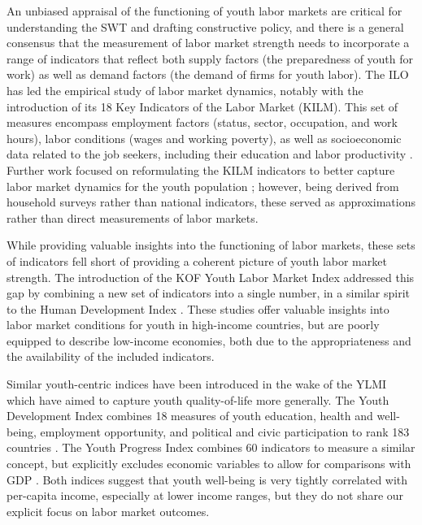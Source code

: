 \documentclass[
  a4paper, twoside, 12pt]{book}
\begin{document}
An unbiased appraisal of the functioning of youth labor markets are critical for understanding the SWT and drafting constructive policy, and there is a general consensus that the measurement of labor market strength needs to incorporate a range of indicators that reflect both supply factors (the preparedness of youth for work) as well as demand factors (the demand of firms for youth labor). The ILO has led the empirical study of labor market dynamics, notably with the introduction of its 18 Key Indicators of the Labor Market (KILM). This set of measures encompass employment factors (status, sector, occupation, and work hours), labor conditions (wages and working poverty), as well as socioeconomic data related to the job seekers, including their education and labor productivity \autocite{ilo2016}. Further work focused on reformulating the KILM indicators to better capture labor market dynamics for the youth population \autocite{elder2010}; however, being derived from household surveys rather than national indicators, these served as approximations rather than direct measurements of labor markets.

While providing valuable insights into the functioning of labor markets, these sets of indicators fell short of providing a coherent picture of youth labor market strength. The introduction of the KOF Youth Labor Market Index \autocite{renold2014,pusterla2015,pusterla2016} addressed this gap by combining a new set of indicators into a single number, in a similar spirit to the Human Development Index \autocite{sudhir1994}. These studies offer valuable insights into labor market conditions for youth in high-income countries, but are poorly equipped to describe low-income economies, both due to the appropriateness and the availability of the included indicators.

Similar youth-centric indices have been introduced in the wake of the YLMI which have aimed to capture youth quality-of-life more generally. The Youth Development Index combines 18 measures of youth education, health and well-being, employment opportunity, and political and civic participation to rank 183 countries \autocite{sen2016}. The Youth Progress Index combines 60 indicators to measure a similar concept, but explicitly excludes economic variables to allow for comparisons with GDP \autocite{lisney2018}. Both indices suggest that youth well-being is very tightly correlated with per-capita income, especially at lower income ranges, but they do not share our explicit focus on labor market outcomes.
\end{document}
